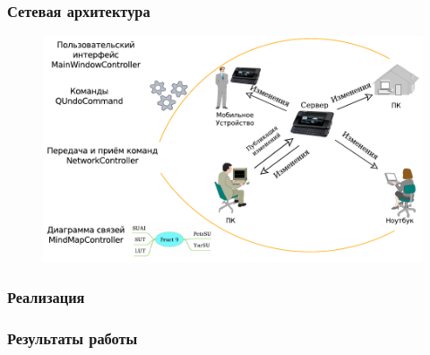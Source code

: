 \documentclass[unicode]{beamer}
\begin{document}
\begin{frame}
\transwipe[direction=90]
\frametitle{Сетевая архитектура}
\begin{figure}[h!] 
\centering
\includegraphics[width=\linewidth]{application-layers-improved} 
\end{figure}
\end{frame}

\begin{frame}
\transwipe[direction=90]
\frametitle{Реализация}

\end{frame}

\begin{frame}
\transwipe[direction=90]
\frametitle{Результаты работы}
\end{frame}
\end{document}
